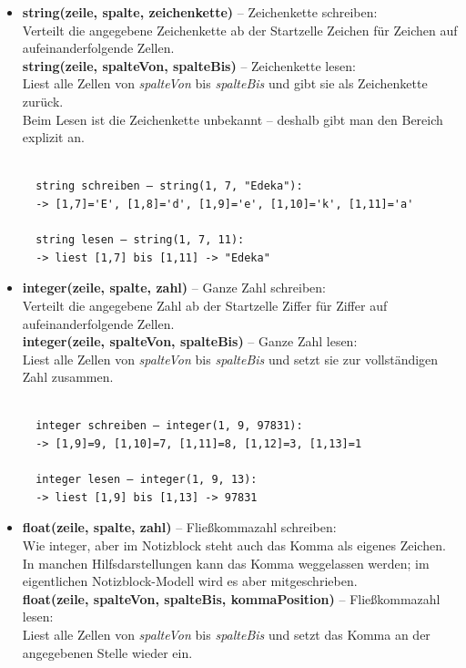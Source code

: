 \documentclass{article}
\begin{document}
        \begin{itemize}
          \item \textbf{string(zeile, spalte, zeichenkette)} – Zeichenkette schreiben:\\
            Verteilt die angegebene Zeichenkette ab der Startzelle Zeichen für Zeichen auf aufeinanderfolgende Zellen.\\
            \textbf{string(zeile, spalteVon, spalteBis)} – Zeichenkette lesen:\\
            Liest alle Zellen von \emph{spalteVon} bis \emph{spalteBis} und gibt sie als Zeichenkette zurück.\\
            Beim Lesen ist die Zeichenkette unbekannt – deshalb gibt man den Bereich explizit an.

          \begin{verbatim}

  string schreiben – string(1, 7, "Edeka"):
  -> [1,7]='E', [1,8]='d', [1,9]='e', [1,10]='k', [1,11]='a'

  string lesen – string(1, 7, 11):
  -> liest [1,7] bis [1,11] -> "Edeka"
          \end{verbatim}

          \item \textbf{integer(zeile, spalte, zahl)} – Ganze Zahl schreiben:\\
            Verteilt die angegebene Zahl ab der Startzelle Ziffer für Ziffer auf aufeinanderfolgende Zellen.\\
            \textbf{integer(zeile, spalteVon, spalteBis)} – Ganze Zahl lesen:\\
            Liest alle Zellen von \emph{spalteVon} bis \emph{spalteBis} und setzt sie zur vollständigen Zahl zusammen.

          \begin{verbatim}

  integer schreiben – integer(1, 9, 97831):
  -> [1,9]=9, [1,10]=7, [1,11]=8, [1,12]=3, [1,13]=1

  integer lesen – integer(1, 9, 13):
  -> liest [1,9] bis [1,13] -> 97831
          \end{verbatim}

          \item \textbf{float(zeile, spalte, zahl)} – Fließkommazahl schreiben:\\
            Wie integer, aber im Notizblock steht auch das Komma als eigenes Zeichen.\\
            In manchen Hilfsdarstellungen kann das Komma weggelassen werden; im eigentlichen Notizblock-Modell wird es aber mitgeschrieben.\\
            	\textbf{float(zeile, spalteVon, spalteBis, kommaPosition)} – Fließkommazahl lesen:\\
            Liest alle Zellen von \emph{spalteVon} bis \emph{spalteBis} und setzt das Komma an der angegebenen Stelle wieder ein.


\end{itemize}
\end{document}
